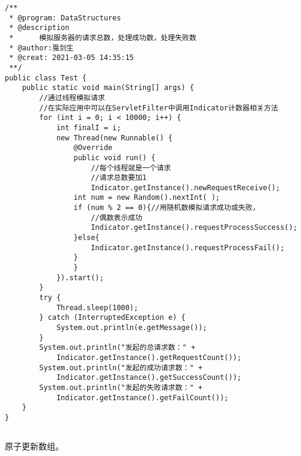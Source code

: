 \documentclass[a4paper]{report}
\begin{document}
\begin{Verbatim}[frame=single,numbersep=5pt,xleftmargin=1.5em,xrightmargin=1.5em]
/**
 * @program: DataStructures
 * @description
 *      模拟服务器的请求总数，处理成功数，处理失败数
 * @author:戛剑生
 * @creat: 2021-03-05 14:35:15
 **/
public class Test {
    public static void main(String[] args) {
        //通过线程模拟请求
        //在实际应用中可以在ServletFilter中调用Indicator计数器相关方法
        for (int i = 0; i < 10000; i++) {
            int finalI = i;
            new Thread(new Runnable() {
                @Override
                public void run() {
                    //每个线程就是一个请求
                    //请求总数要加1
                    Indicator.getInstance().newRequestReceive();
                int num = new Random().nextInt( );
                if (num % 2 == 0){//用随机数模拟请求成功或失败，
                    //偶数表示成功
                    Indicator.getInstance().requestProcessSuccess();
                }else{
                    Indicator.getInstance().requestProcessFail();
                }
                }
            }).start();
        }
        try {
            Thread.sleep(1000);
        } catch (InterruptedException e) {
            System.out.println(e.getMessage());
        }
        System.out.println("发起的总请求数：" +
            Indicator.getInstance().getRequestCount());
        System.out.println("发起的成功请求数：" +
            Indicator.getInstance().getSuccessCount());
        System.out.println("发起的失败请求数：" +
            Indicator.getInstance().getFailCount());
    }
}
\end{Verbatim}
\subsection{}
原子更新数组。
\end{document}
